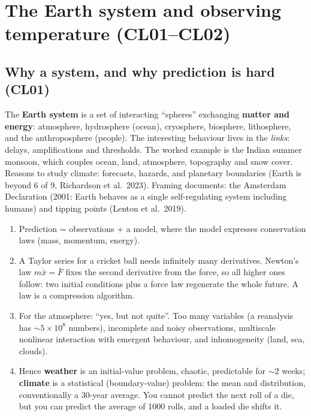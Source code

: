 \section{The Earth system and observing temperature (CL01--CL02)}

\subsection{Why a system, and why prediction is hard (CL01)}
The \textbf{Earth system} is a set of interacting ``spheres'' exchanging \textbf{matter and energy}: atmosphere, hydrosphere
(ocean), cryosphere, biosphere, lithosphere, and the anthroposphere (people). The interesting behaviour lives in the
\emph{links}: delays, amplifications and thresholds. The worked example is the Indian summer monsoon, which couples ocean,
land, atmosphere, topography and snow cover. Reasons to study climate: forecasts, hazards, and planetary boundaries
(Earth is beyond 6 of 9, Richardson et al.\ 2023). Framing documents: the Amsterdam Declaration (2001: Earth behaves as a
single self-regulating system including humans) and tipping points (Lenton et al.\ 2019).

\begin{chain}
\begin{enumerate}
\item Prediction = observations + a model, where the model expresses conservation laws (mass, momentum, energy).
\item A Taylor series for a cricket ball needs infinitely many derivatives. Newton's law $m\ddot{\bar x}=\bar F$ fixes the second
derivative from the force, so all higher ones follow: two initial conditions plus a force law regenerate the whole future.
A law is a compression algorithm.
\item For the atmosphere: ``yes, but not quite''. Too many variables (a reanalysis has $\sim5\times10^8$ numbers), incomplete
and noisy observations, multiscale nonlinear interaction with emergent behaviour, and inhomogeneity (land, sea, clouds).
\item Hence \textbf{weather} is an initial-value problem, chaotic, predictable for $\sim$2 weeks; \textbf{climate} is a
statistical (boundary-value) problem: the mean and distribution, conventionally a 30-year average. You cannot predict
the next roll of a die, but you can predict the average of 1000 rolls, and a loaded die shifts it.
\end{enumerate}
\end{chain}


